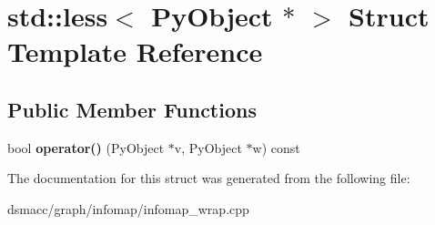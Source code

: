 \hypertarget{structstd_1_1less_3_01PyObject_01_5_01_4}{}\section{std\+:\+:less$<$ Py\+Object $\ast$ $>$ Struct Template Reference}
\label{structstd_1_1less_3_01PyObject_01_5_01_4}
\subsection*{Public Member Functions}
\begin{DoxyCompactItemize}
\item 
\mbox{\label{structstd_1_1less_3_01PyObject_01_5_01_4_ae89d137f05b6d1c8c632ec1c5bf4562d}} 
bool {\bfseries operator()} (Py\+Object $\ast$v, Py\+Object $\ast$w) const
\end{DoxyCompactItemize}


The documentation for this struct was generated from the following file\+:\begin{DoxyCompactItemize}
\item 
dsmacc/graph/infomap/infomap\+\_\+wrap.\+cpp\end{DoxyCompactItemize}
